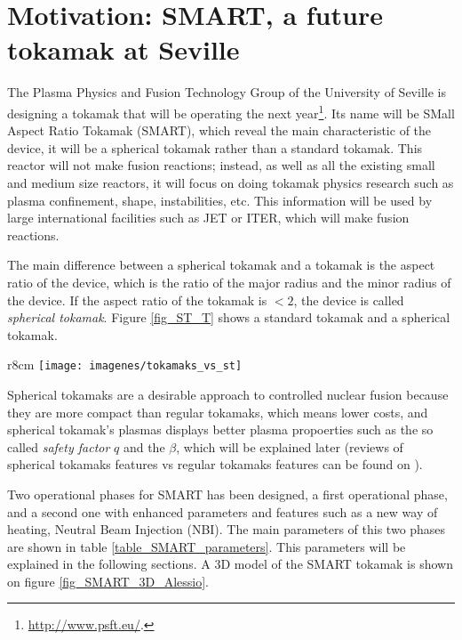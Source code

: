 \documentclass[a4paper,12pt,oneside]{book}
\begin{document}
\section[Motivation: SMART]{Motivation: SMART, a future tokamak at Seville}
\label{sec_SMART_intro}
The Plasma Physics and Fusion Technology Group of the University of Seville is designing a tokamak that will be operating the next year\footnote{\url{http://www.psft.eu/}.}. Its name will be SMall Aspect Ratio Tokamak (SMART), which reveal the main characteristic of the device, it will be a spherical tokamak  rather than a standard tokamak. This reactor will not make fusion reactions; instead, as well as all the existing small and medium size reactors, it will focus on doing tokamak physics research such as plasma confinement, shape, instabilities, etc. This information will be used by large international facilities such as JET or ITER, which will make fusion reactions.


The main difference between a spherical tokamak and a tokamak is the aspect ratio of the device, which is the ratio of the major radius and the minor radius of the device. If the aspect ratio of the tokamak is $< 2$, the device is called \textit{spherical tokamak}. Figure \ref{fig_ST_T} shows a standard tokamak and a spherical tokamak.

\begin{wrapfigure}{r}{8cm}
\texttt{[image: imagenes/tokamaks\_vs\_st]}
\caption{Tokamaks and spherical tokamaks. Source: \cite{ST_vs_T}.}
\label{fig_ST_T}
\end{wrapfigure}

Spherical tokamaks are a desirable approach to controlled nuclear fusion because they are more compact than regular tokamaks, which means lower costs, and spherical tokamak's plasmas displays better plasma propoerties such as the so called  \textit{safety factor} $q$ and the $\beta$, which will be explained later (reviews of spherical tokamaks features vs regular tokamaks features can be found on \cite{ST_vs_T,Peng_1986}).


Two operational phases for SMART has been designed, a first operational phase, and a second one with enhanced parameters and features such as a new way of heating, Neutral Beam Injection (NBI). The main parameters of this two phases are shown in table \ref{table_SMART_parameters}. This parameters will be explained in the following sections. A 3D model of the SMART tokamak is shown on figure \ref{fig_SMART_3D_Alessio}.
\end{document}
